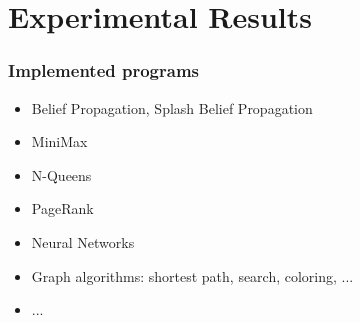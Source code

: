 \documentclass{beamer}
\begin{document}
\section{Experimental Results}

\begin{frame}[fragile]
   \frametitle{Implemented programs}
   \begin{itemize}
      \item Belief Propagation, Splash Belief Propagation
      \item MiniMax
      \item N-Queens
      \item PageRank
      \item Neural Networks
      \item Graph algorithms: shortest path, search, coloring, ...
      \item ...
   \end{itemize}
\end{frame}
\end{document}
